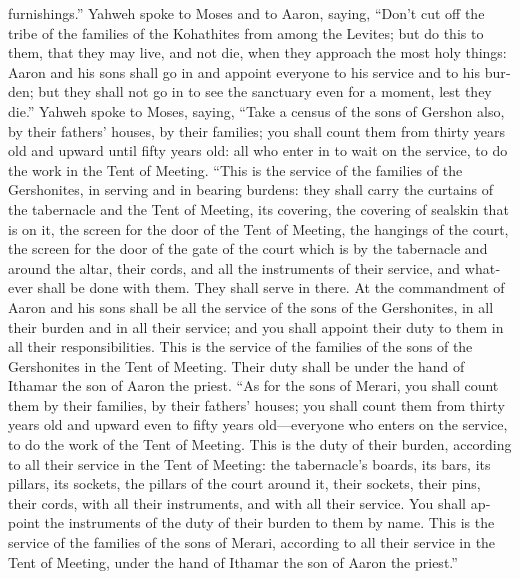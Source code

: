 \begin{paracol}{2}
\begin{otherlanguage}{english}
furnishings.''  Yahweh spoke to Moses and to Aaron,
saying,  ``Don't cut off the tribe of the families of the
Kohathites from among the Levites;  but do this to them,
that they may live, and not die, when they approach the most holy
things: Aaron and his sons shall go in and appoint everyone to his
service and to his burden;  but they shall not go in to
see the sanctuary even for a moment, lest they die.'' 
Yahweh spoke to Moses, saying,  ``Take a census of the
sons of Gershon also, by their fathers' houses, by their families;
 you shall count them from thirty years old and upward
until fifty years old: all who enter in to wait on the service, to do
the work in the Tent of Meeting.  ``This is the service
of the families of the Gershonites, in serving and in bearing burdens:
 they shall carry the curtains of the tabernacle and the
Tent of Meeting, its covering, the covering of sealskin that is on it,
the screen for the door of the Tent of Meeting,  the
hangings of the court, the screen for the door of the gate of the court
which is by the tabernacle and around the altar, their cords, and all
the instruments of their service, and whatever shall be done with them.
They shall serve in there.  At the commandment of Aaron
and his sons shall be all the service of the sons of the Gershonites, in
all their burden and in all their service; and you shall appoint their
duty to them in all their responsibilities.  This is the
service of the families of the sons of the Gershonites in the Tent of
Meeting. Their duty shall be under the hand of Ithamar the son of Aaron
the priest.  ``As for the sons of Merari, you shall count
them by their families, by their fathers' houses;  you
shall count them from thirty years old and upward even to fifty years
old---everyone who enters on the service, to do the work of the Tent of
Meeting.  This is the duty of their burden, according to
all their service in the Tent of Meeting: the tabernacle's boards, its
bars, its pillars, its sockets,  the pillars of the court
around it, their sockets, their pins, their cords, with all their
instruments, and with all their service. You shall appoint the
instruments of the duty of their burden to them by name. 
This is the service of the families of the sons of Merari, according to
all their service in the Tent of Meeting, under the hand of Ithamar the
son of Aaron the priest.''


\end{otherlanguage}
\end{paracol}
